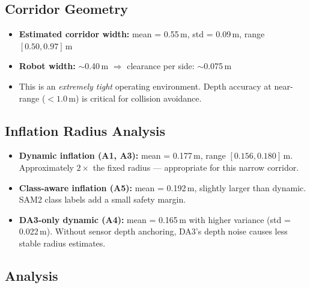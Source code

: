 \documentclass[11pt,a4paper]{article}
\begin{document}
\subsection{Corridor Geometry}

\begin{itemize}[nosep]
  \item \textbf{Estimated corridor width:} mean = 0.55\,m, std = 0.09\,m,
    range $[0.50, 0.97]$\,m
  \item \textbf{Robot width:} $\sim$0.40\,m $\Rightarrow$ clearance per side:
    $\sim$0.075\,m
  \item This is an \emph{extremely tight} operating environment. Depth accuracy
    at near-range ($< 1.0$\,m) is critical for collision avoidance.
\end{itemize}

\subsection{Inflation Radius Analysis}

\begin{itemize}[nosep]
  \item \textbf{Dynamic inflation (A1, A3):} mean = 0.177\,m, range
    $[0.156, 0.180]$\,m. Approximately $2\times$ the fixed radius ---
    appropriate for this narrow corridor.
  \item \textbf{Class-aware inflation (A5):} mean = 0.192\,m, slightly larger
    than dynamic. SAM2 class labels add a small safety margin.
  \item \textbf{DA3-only dynamic (A4):} mean = 0.165\,m with higher variance
    (std = 0.022\,m). Without sensor depth anchoring, DA3's depth noise
    causes less stable radius estimates.
\end{itemize}

\subsection{Analysis}
\end{document}
